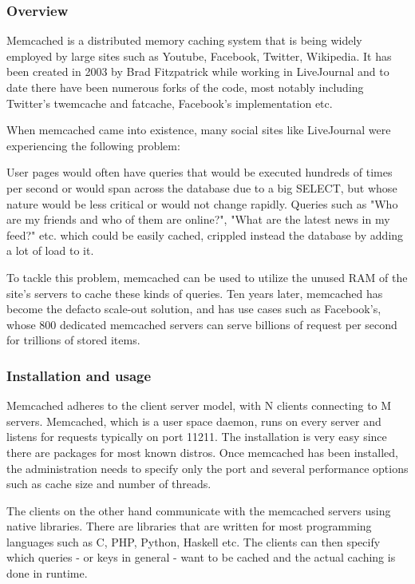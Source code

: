 \subsubsection{Overview}

Memcached is a distributed memory caching system that is being widely employed 
by large sites such as Youtube, Facebook, Twitter, Wikipedia. It has been 
created in 2003 by Brad Fitzpatrick while working in LiveJournal and to date 
there have been numerous forks of the code, most notably including Twitter's 
twemcache and fatcache, Facebook's implementation etc.

When memcached came into existence, many social sites like LiveJournal were 
experiencing the following problem:

User pages would often have queries that would be executed hundreds of times 
per second or would span across the database due to a big SELECT, but whose 
nature would be less critical or would not change rapidly. Queries such as "Who 
are my friends and who of them are online?", "What are the latest news in my 
feed?" etc. which could be easily cached, crippled instead the database by 
adding a lot of load to it.

To tackle this problem, memcached can be used to utilize the unused RAM of the 
site's servers to cache these kinds of queries. Ten years later, memcached has 
become the defacto scale-out solution, and has use cases such as Facebook's, 
whose 800 dedicated memcached servers can serve billions of request per second 
for trillions of stored items\cite{facebook-memcached}.

\subsubsection{Installation and usage}

Memcached adheres to the client server model, with N clients connecting to M 
servers. Memcached, which is a user space daemon, runs on every server and
listens for requests typically on port 11211. The installation is very easy 
since there are packages for most known distros. Once memcached has been 
installed, the administration needs to specify only the port and several 
performance options such as cache size and number of threads.

The clients on the other hand communicate with the memcached servers using 
native libraries. There are libraries that are written for most programming 
languages such as C, PHP, Python, Haskell etc. The clients can then specify 
which queries - or keys in general - want to be cached and the actual caching 
is done in runtime.

